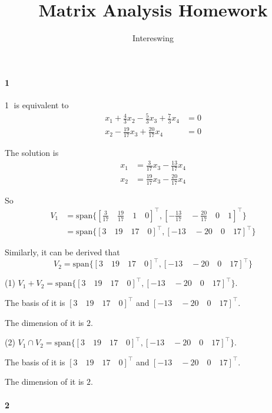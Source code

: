 \documentclass{article}
\title{Matrix Analysis Homework}
\author{Intereswing}
\begin{document}
	
\maketitle
\paragraph{1}
\textcircled{1} is equivalent to
\begin{align*}
	x_1 + \frac{4}{3} x_2 - \frac{5}{3}x_3 + \frac{7}{3}x_4 &= 0 \\
	x_2 - \frac{19}{17}x_3 + \frac{20}{17}x_4 &=0
\end{align*}

The solution is 
\begin{align*}
	x_1 &= \frac{3}{17}x_3 - \frac{13}{17}x_4\\
	x_2 &= \frac{19}{17}x_3 - \frac{20}{17}x_4
\end{align*}

So
\begin{align*}
	V_1 &= \mathrm{span}\{[\frac{3}{17}\quad \frac{19}{17} \quad 1 \quad 0]^\top , [-\frac{13}{17}\quad -\frac{20}{17} \quad 0 \quad 1]^\top\} \\
	&= \mathrm{span}\{[3\quad19\quad17\quad0]^\top, [-13\quad-20\quad0\quad17]^\top \}
\end{align*}

Similarly, it can be derived that
\[
V_2 = \mathrm{span}\{[3\quad19\quad17\quad0]^\top, [-13\quad-20\quad0\quad17]^\top \}  
\]

(1) $V_1 + V_2 = \mathrm{span}\{[3\quad19\quad17\quad0]^\top, [-13\quad-20\quad0\quad17]^\top \}$.

The basis of it is $[3\quad19\quad17\quad0]^\top$ and $[-13\quad-20\quad0\quad17]^\top$.

The dimension of it is $2$.

(2) $V_1 \cap V_2 = \mathrm{span}\{[3\quad19\quad17\quad0]^\top, [-13\quad-20\quad0\quad17]^\top \}$.

The basis of it is $[3\quad19\quad17\quad0]^\top$ and $[-13\quad-20\quad0\quad17]^\top$.

The dimension of it is $2$.

\paragraph{2}























	
\end{document}
